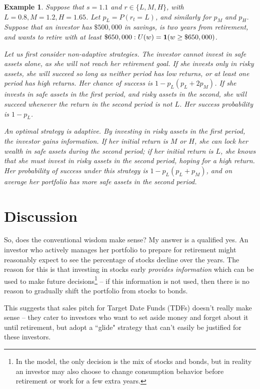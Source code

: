 \documentclass[11pt, oneside]{article}   	%
\newtheorem{example}{Example}
\begin{document}
\begin{example}
Suppose that $s = 1.1$ and $r \in \{L, M, H\}$, with $L = 0.8, M = 1.2, H = 1.65$. Let $p_L = P(r_t = L)$, and similarly for $p_M$ and $p_H$. Suppose that an investor has $\$500,000$ in savings, is two years from retirement, and wants to retire with at least $\$650,000:  U(w) = {\bf 1}(w \geq \$650,000)$.

Let us first consider non-adaptive strategies. The investor cannot invest in safe assets alone, as she will not reach her retirement goal. If she invests only in risky assets, she will succeed so long as neither period has low returns, or at least one period has high returns. Her chance of success is $1 - p_L(p_L + 2p_M)$. If she invests in safe assets in the first period, and risky assets in the second, she will succeed whenever the return in the second period is not $L$. Her success probability is $1 - p_L$. 

An optimal strategy is adaptive. By investing in risky assets in the first period, the investor gains information. If her initial return is $M$ or $H$, she can lock her wealth in safe assets during the second period; if her initial return is $L$, she knows that she must invest in risky assets in the second period, hoping for a high return. Her probability of success under this strategy is $1 - p_L(p_L + p_M)$, and on average her portfolio has more safe assets in the second period.
\end{example}


\section{Discussion}

So, does the conventional wisdom make sense? My answer is a qualified yes. An investor who actively manages her portfolio to prepare for retirement might reasonably expect to see the percentage of stocks decline over the years. The reason for this is that investing in stocks early {\em provides information} which can be used to make future decisions\footnote{In the model, the only decision is the mix of stocks and bonds, but in reality an investor may also choose to change consumption behavior before retirement or work for a few extra years.} -- if this information is not used, then there is no reason to gradually shift the portfolio from stocks to bonds.

This suggests that sales pitch for Target Date Funds (TDFs) doesn't really make sense -- they cater to investors who want to set aside money and forget about it until retirement, but adopt a ``glide" strategy that can't easily be justified for these investors. 
\end{document}
